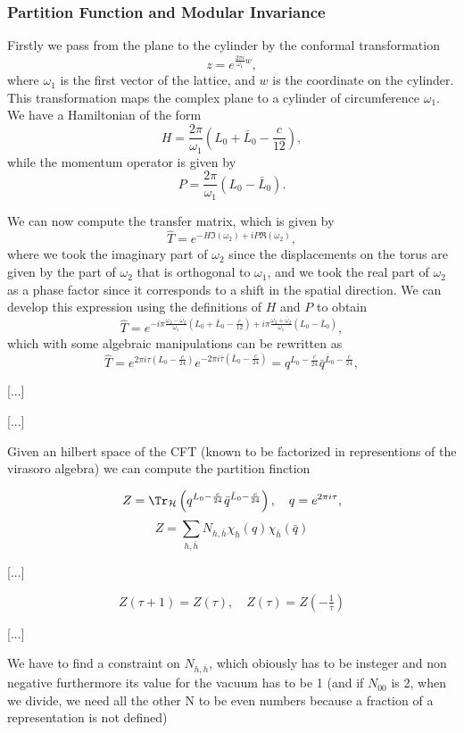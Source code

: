 \subsubsection{Partition Function and Modular Invariance}

Firstly we pass from the plane to the cylinder by the conformal transformation
\[
    z = e^{\frac{2\pi i}{\omega_1}w},
\]
where \(\omega_1\) is the first vector of the lattice, and \(w\) is the coordinate on the cylinder. This transformation maps the complex plane to a cylinder of circumference \(\omega_1\). We have a Hamiltonian of the form
\[
    H = \frac{2\pi}{\omega_1} \left( L_0 + \bar{L}_0 - \frac{c}{12}\right),
\]
while the momentum operator is given by
\[
    P = \frac{2\pi}{\omega_1} \left( L_0 - \bar{L}_0 \right).
\]

We can now compute the transfer matrix, which is given by
\[
    \hat{T} = e^{-H \Im(\omega_2) + i P \Re(\omega_2)},
\]
where we took the imaginary part of \(\omega_2\) since the displacements on the torus are given by the part of \(\omega_2\) that is orthogonal to \(\omega_1\), and we took the real part of \(\omega_2\) as a phase factor since it corresponds to a shift in the spatial direction. We can develop this expression using the definitions of \(H\) and \(P\) to obtain
\[
    \hat{T} = e^{-i \pi \frac{\omega_2 - \bar{\omega}_2}{\omega_1} \left( L_0 + \bar{L}_0 - \frac{c}{12}\right) + i\pi \frac{\omega_2 + \bar{\omega}_2}{\omega_1} \left( L_0 - \bar{L}_0 \right)},
\]
which with some algebraic manipulations can be rewritten as
\[
    \hat{T} = e^{2\pi i \tau (L_0 - \frac{c}{24})} e^{-2\pi i \bar{\tau} (\bar{L}_0 - \frac{c}{24})} = q^{L_0 - \frac{c}{24}} \bar{q}^{\bar{L}_0 - \frac{c}{24}},
\]




[...]

[...]

Given an hilbert space of the CFT (known to be factorized in representions of the virasoro algebra) we can compute the partition finction


\[
    Z = \Tr_{\mathcal{H}}\left(q^{L_0 - \frac{c}{24}} \bar{q}^{\bar{L}_0 - \frac{c}{24}}\right), \quad q = e^{2 \pi i \tau},
\]
\[
    Z = \sum_{h,\bar{h}} N_{h,\bar{h}}\chi_h(q)\chi_{\bar{h}}(\bar{q})
\]

[...]

\[
    Z(\tau + 1) = Z(\tau), \quad Z(\tau) = Z(-\tfrac{1}{\tau})
\]

[...]

We have to find a constraint on \(N_{h,\bar{h}}\), which obiously has to be insteger and non negative
furthermore its value for the vacuum has to be 1 (and if \(N_{00} \) is 2, when we divide, we need all the other N to be even numbers because a fraction of a representation is not defined)


